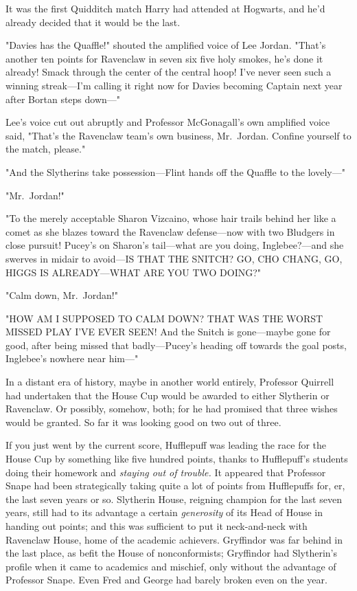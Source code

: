 It was the first Quidditch match Harry had attended at Hogwarts, and he'd
already decided that it would be the last.

"Davies has the Quaffle!" shouted the amplified voice of Lee Jordan. "That's
another ten points for Ravenclaw in seven{\el} six{\el} five{\el} holy
smokes, he's done it already! Smack through the center of the central hoop!
I've never seen such a winning streak—I'm calling it right now for Davies
becoming Captain next year after Bortan steps down—"

Lee's voice cut out abruptly and Professor McGonagall's own amplified voice
said, "That's the Ravenclaw team's own business, Mr.~Jordan. Confine yourself
to the match, please."

"And the Slytherins take possession—Flint hands off the Quaffle to the
lovely—"

"Mr.~Jordan!"

"To the merely acceptable Sharon Vizcaino, whose hair trails behind her like a
comet as she blazes toward the Ravenclaw defense—now with two Bludgers in
close pursuit! Pucey's on Sharon's tail—what are you doing, Inglebee?—and
she swerves in midair to avoid—IS THAT THE SNITCH? GO, CHO CHANG, GO, HIGGS
IS ALREADY—WHAT ARE YOU TWO DOING?"

"Calm down, Mr.~Jordan!"

"HOW AM I SUPPOSED TO CALM DOWN? THAT WAS THE WORST MISSED PLAY I'VE EVER SEEN!
And the Snitch is gone—maybe gone for good, after being missed that
badly—Pucey's heading off towards the goal posts, Inglebee's nowhere near
him—"

In a distant era of history, maybe in another world entirely, Professor
Quirrell had undertaken that the House Cup would be awarded to either Slytherin
or Ravenclaw. Or possibly, somehow, both; for he had promised that three wishes
would be granted. So far it was looking good on two out of three.

If you just went by the current score, Hufflepuff was leading the race for the
House Cup by something like five hundred points, thanks to Hufflepuff's
students doing their homework and \emph{staying out of trouble.} It appeared
that Professor Snape had been strategically taking quite a lot of points from
Hufflepuffs for, er, the last seven years or so. Slytherin House, reigning
champion for the last seven years, still had to its advantage a certain
\emph{generosity} of its Head of House in handing out points; and this was
sufficient to put it neck-and-neck with Ravenclaw House, home of the academic
achievers. Gryffindor was far behind in the last place, as befit the House of
nonconformists; Gryffindor had Slytherin's profile when it came to academics
and mischief, only without the advantage of Professor Snape. Even Fred and
George had barely broken even on the year.

